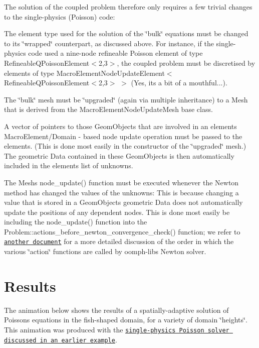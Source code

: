 The solution of the coupled problem therefore only requires a few trivial changes to the single-\/physics (Poisson) code\+:
\begin{DoxyEnumerate}
\item The element type used for the solution of the \char`\"{}bulk\char`\"{} equations must be changed to its \char`\"{}wrapped\char`\"{} counterpart, as discussed above. For instance, if the single-\/physics code used a nine-\/node refineable Poisson element of type {\ttfamily Refineable\+Q\+Poisson\+Element$<$2,3$>$}, the coupled problem must be discretised by elements of type {\ttfamily Macro\+Element\+Node\+Update\+Element$<$Refineable\+Q\+Poisson\+Element$<$2,3$>$} $>$ (Yes, it\textquotesingle{}s a bit of a mouthful...).
\item The \char`\"{}bulk\char`\"{} mesh must be \char`\"{}upgraded\char`\"{} (again via multiple inheritance) to a Mesh that is derived from the {\ttfamily Macro\+Element\+Node\+Update\+Mesh} base class.
\item A vector of pointers to those {\ttfamily Geom\+Objects} that are involved in an element\textquotesingle{}s {\ttfamily Macro\+Element/\+Domain} -\/ based node update operation must be passed to the elements. (This is done most easily in the constructor of the \char`\"{}upgraded\char`\"{} mesh.) The geometric {\ttfamily Data} contained in these {\ttfamily Geom\+Objects} is then automatically included in the elements\textquotesingle{} list of unknowns.
\item The Mesh\textquotesingle{}s {\ttfamily node\+\_\+update()} function must be executed whenever the Newton method has changed the values of the unknowns\+: This is because changing a value that is stored in a {\ttfamily Geom\+Object\textquotesingle{}s} geometric {\ttfamily Data} does not automatically update the positions of any dependent nodes. This is done most easily be including the {\ttfamily node\+\_\+update()} function into the {\ttfamily Problem\+::actions\+\_\+before\+\_\+newton\+\_\+convergence\+\_\+check()} function; we refer to \href{../../../order_of_action_functions/html/index.html}{\tt another document} for a more detailed discussion of the order in which the various \char`\"{}action\char`\"{} functions are called by {\ttfamily oomph-\/lib\textquotesingle{}s} Newton solver.
\end{DoxyEnumerate}

 

\hypertarget{index_results}{}\section{Results}\label{index_results}
The animation below shows the results of a spatially-\/adaptive solution of Poisson\textquotesingle{}s equations in the fish-\/shaped domain, for a variety of domain \char`\"{}heights\char`\"{}. This animation was produced with the \href{../../../poisson/fish_poisson/html/index.html}{\tt single-\/physics Poisson solver discussed in an earlier example}.

